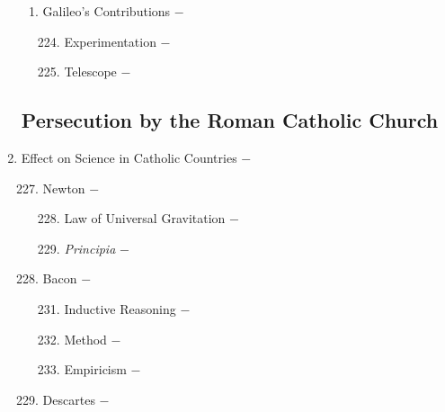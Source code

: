 \documentclass[12pt]{article}
\begin{document}
\begin{enumerate}
\begin{enumerate}[label=\arabic{*}.]
\item Galileo's Contributions $-$ 

\begin{enumerate}[label=\arabic{*}.]
\setcounter{enumiii}{223}

\item Experimentation $-$ 

\item Telescope $-$


\end{enumerate}



\end{enumerate}
\setcounter{enumi}{225}

\subsection{Persecution by the Roman Catholic Church}

\item Effect on Science in Catholic Countries $-$

 
\begin{enumerate}[label=\arabic{*}.]
\setcounter{enumii}{226}

\item Newton $-$ 

\begin{enumerate}[label=\arabic{*}.]
\setcounter{enumiii}{227}

\item Law of Universal Gravitation $-$ 

\item \textit{Principia} $-$

\end{enumerate}
\setcounter{enumii}{229}

\item Bacon $-$ 

\begin{enumerate}[label=\arabic{*}.]
\setcounter{enumiii}{230}

\item Inductive Reasoning $-$ 

\item Method $-$

\item Empiricism $-$

\end{enumerate}
\setcounter{enumii}{233}

\item Descartes $-$ 


\end{enumerate}
\end{enumerate}
\end{document}
